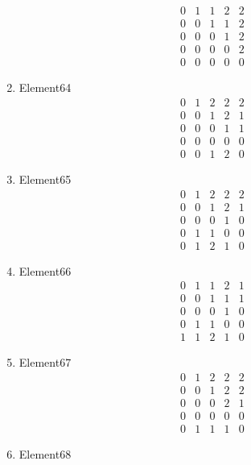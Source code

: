 \documentclass[12pt]{article}
\begin{document}
\begin{multicols}{3}
\begin{enumerate}
\begin{equation*}
\begin{array}{ccccc}
0&1&1&2&2\\
0&0&1&1&2\\
0&0&0&1&2\\
0&0&0&0&2\\
0&0&0&0&0
\end{array}
\end{equation*}
\item Element64
\begin{equation*}
\begin{array}{ccccc}
0&1&2&2&2\\
0&0&1&2&1\\
0&0&0&1&1\\
0&0&0&0&0\\
0&0&1&2&0
\end{array}
\end{equation*}
\item Element65
\begin{equation*}
\begin{array}{ccccc}
0&1&2&2&2\\
0&0&1&2&1\\
0&0&0&1&0\\
0&1&1&0&0\\
0&1&2&1&0
\end{array}
\end{equation*}
\item Element66
\begin{equation*}
\begin{array}{ccccc}
0&1&1&2&1\\
0&0&1&1&1\\
0&0&0&1&0\\
0&1&1&0&0\\
1&1&2&1&0
\end{array}
\end{equation*}
\item Element67
\begin{equation*}
\begin{array}{ccccc}
0&1&2&2&2\\
0&0&1&2&2\\
0&0&0&2&1\\
0&0&0&0&0\\
0&1&1&1&0
\end{array}
\end{equation*}
\item Element68
\begin{equation*}
\begin{array}{ccccc}

\end{array}
\end{equation*}
\end{enumerate}
\end{multicols}
\end{document}

